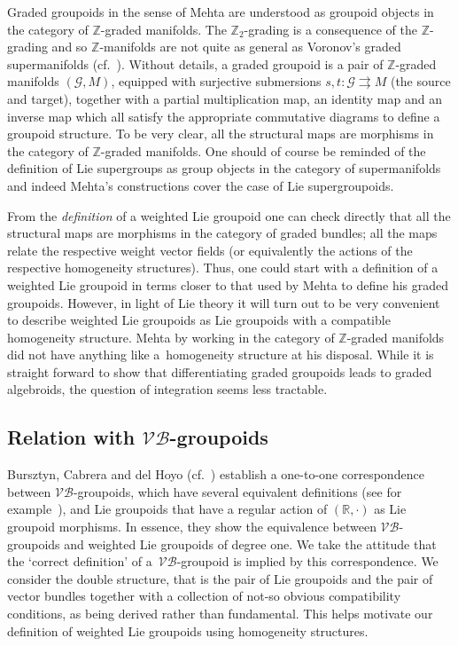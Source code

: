 \documentclass[10pt,a4paper]{amsart}
\numberwithin{equation}{section}
\begin{document}
\begin{Remark}
 Graded groupoids in the sense of Mehta \cite{Mehta:2006,Mehta:2009} are understood as groupoid objects in the category of $\mathbb{Z}$-graded manifolds.  The $\mathbb{Z}_{2}$-grading is a consequence of the  $\mathbb{Z}$-grading and so $\mathbb{Z}$-manifolds are not quite as general as Voronov's graded supermanifolds (cf.~\cite{Voronov:2001qf}).  Without details,  a graded groupoid is a pair of $\mathbb{Z}$-graded manifolds  $(\mathcal{G}, M)$, equipped with surjective submersions $s,t \colon \mathcal{G} \rightrightarrows M$ (the source and target), together with a partial multiplication map, an identity  map and an inverse map which all satisfy the appropriate commutative diagrams to def\/ine a groupoid structure. To be very clear, all the structural maps are morphisms in the category of $\mathbb{Z}$-graded manifolds.   One should of course  be reminded of the  def\/inition of Lie supergroups as group objects in the category of supermanifolds and indeed Mehta's constructions cover the case of Lie supergroupoids.

 From the \emph{definition} of a weighted Lie groupoid one can check directly that all the structural maps are morphisms in the category of graded bundles; all the maps relate the respective weight vector f\/ields (or equivalently the actions of the respective homogeneity structures). Thus, one could start with a def\/inition of a weighted Lie groupoid  in terms closer to that used by Mehta to def\/ine his graded groupoids. However, in light of Lie theory it will turn out to be very convenient to describe weighted Lie groupoids as Lie groupoids with a compatible homogeneity structure. Mehta by working in the category of $\mathbb{Z}$-graded manifolds did not have anything like a~homogeneity structure at his disposal. While it is straight forward to show that dif\/ferentiating graded groupoids leads to graded algebroids, the question of integration seems less tractable.
\end{Remark}

\subsection[Relation with $\mathcal{VB}$-groupoids]{Relation with $\boldsymbol{\mathcal{VB}}$-groupoids}

Bursztyn, Cabrera and del Hoyo  (cf.~\cite[Theorem~3.2.3]{Bursztyn:2014}) establish a one-to-one correspondence between $\mathcal{VB}$-groupoids, which have several equivalent def\/initions (see for example~\cite{Gracia-Saz:2010}), and Lie groupoids that have a regular action of $(\mathbb{R}, \cdot)$ as Lie groupoid morphisms. In essence, they show the equivalence between $\mathcal{VB}$-groupoids and weighted Lie groupoids of degree one. We take the attitude that the `correct def\/inition'  of a~$\mathcal{VB}$-groupoid is implied by this correspondence. We consider the double structure, that is the pair of Lie groupoids and the pair of vector bundles together with a collection of not-so obvious compatibility conditions,  as being derived  rather than fundamental.  This helps motivate our def\/inition of weighted Lie groupoids using homogeneity structures.
\end{document}
